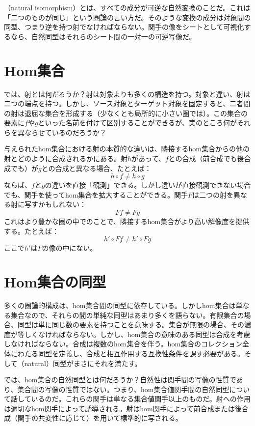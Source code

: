 （natural isomorphism）とは、すべての成分が可逆な自然変換のことだ。これは「二つのものが同じ」という圏論の言い方だ。そのような変換の成分は対象間の同型、つまり逆を持つ射でなければならない。関手の像をシートとして可視化するなら、自然同型はそれらのシート間の一対一の可逆写像だ。

\section{Hom集合}

では、射とは何だろうか？射は対象よりも多くの構造を持つ。対象と違い、射は二つの端点を持つ。しかし、ソース対象とターゲット対象を固定すると、二者間の射は退屈な集合を形成する（少なくとも局所的に小さい圏では）。この集合の要素に$f$や$g$といった名前を付けて区別することができるが、実のところ何がそれらを異ならせているのだろうか？

与えられたhom集合における射の本質的な違いは、隣接するhom集合からの他の射とどのように合成されるかにある。射$h$があって、$f$との合成（前合成でも後合成でも）が$g$との合成と異なる場合、たとえば：
\[h \circ f \neq h \circ g\]
ならば、$f$と$g$の違いを直接「観測」できる。しかし違いが直接観測できない場合でも、関手を使ってhom集合を拡大することができる。関手$F$は二つの射を異なる射に写すかもしれない：
\[F f \neq F g\]
これはより豊かな圏の中でのことで、隣接するhom集合がより高い解像度を提供する。たとえば：
\[h' \circ F f \neq h' \circ F g\]
ここで$h'$は$F$の像の中にない。

\section{Hom集合の同型}

多くの圏論的構成は、hom集合間の同型に依存している。しかしhom集合は単なる集合なので、それらの間の単純な同型はあまり多くを語らない。有限集合の場合、同型は単に同じ数の要素を持つことを意味する。集合が無限の場合、その濃度が等しくなければならない。しかし、hom集合の意味のある同型は合成を考慮しなければならない。合成は複数のhom集合を伴う。hom集合のコレクション全体にわたる同型を定義し、合成と相互作用する互換性条件を課す必要がある。そして（natural）同型がまさにそれを満たす。

では、hom集合の自然同型とは何だろうか？自然性は関手間の写像の性質であり、集合間の写像の性質ではない。つまり、hom集合値関手間の自然同型について話しているのだ。これらの関手は単なる集合値関手以上のものだ。射への作用は適切なhom関手によって誘導される。射はhom関手によって前合成または後合成（関手の共変性に応じて）を用いて標準的に写される。

